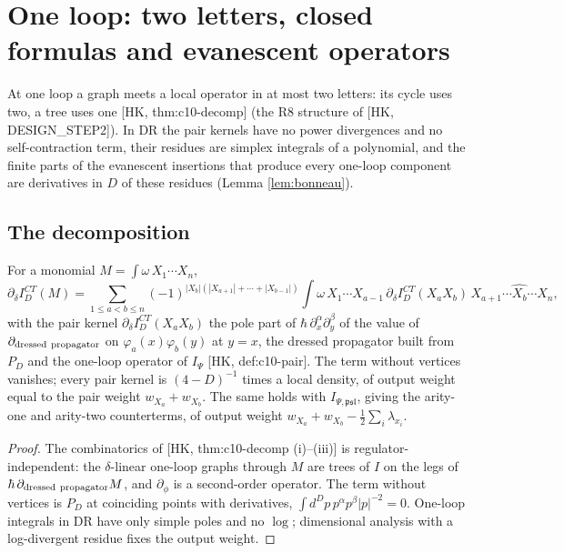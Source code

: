 
\section{One loop: two letters, closed formulas and evanescent operators}
\label{sec:oneloop}

At one loop a graph meets a local operator in at most two letters: its cycle uses two, a tree uses one [HK, thm:c10-decomp] (the R8 structure of [HK, DESIGN\_STEP2]). In DR the pair kernels have no power divergences and no self-contraction term, their residues are simplex integrals of a polynomial, and the finite parts of the evanescent insertions that produce every one-loop component are derivatives in $D$ of these residues (Lemma \ref{lem:bonneau}).

\subsection{The decomposition}

\begin{theorem}
\label{thm:decompD}
For a monomial $M=\int\omega\,X_1\cdots X_n$,
\[
\partial_\delta I^{CT}_D(M)=\sum_{1\le a<b\le n}(-1)^{|X_b|(|X_{a+1}|+\cdots+|X_{b-1}|)}\int\omega\,X_1\cdots X_{a-1}\,\partial_\delta I^{CT}_D(X_aX_b)\,X_{a+1}\cdots\widehat{X_b}\cdots X_n,
\]
with the pair kernel $\partial_\delta I^{CT}_D(X_aX_b)$ the pole part of $\hbar\,\partial^\alpha_x\partial^\beta_y$ of the value of $\partial_{\rm dressed\ propagator}$ on $\varphi_a(x)\varphi_b(y)$ at $y=x$, the dressed propagator built from $P_D$ and the one-loop operator of $I_{\Psi}$ [HK, def:c10-pair]. The term without vertices vanishes; every pair kernel is $(4-D)^{-1}$ times a local density, of output weight equal to the pair weight $w_{X_a}+w_{X_b}$. The same holds with $I_{\Psi,\mathfrak{psl}}$, giving the arity-one and arity-two counterterms, of output weight $w_{X_a}+w_{X_b}-\frac12\sum_i\lambda_{x_i}$.
\end{theorem}

\begin{proof}
The combinatorics of [HK, thm:c10-decomp (i)--(iii)] is regulator-independent: the $\delta$-linear one-loop graphs through $M$ are trees of $I$ on the legs of $\hbar\,\partial_{\rm dressed\ propagator}M$, and $\partial_\phi$ is a second-order operator. The term without vertices is $P_D$ at coinciding points with derivatives, $\int d^Dp\,p^\alpha p^\beta|p|^{-2}=0$. One-loop integrals in DR have only simple poles and no $\log$; dimensional analysis with a log-divergent residue fixes the output weight.
\end{proof}

